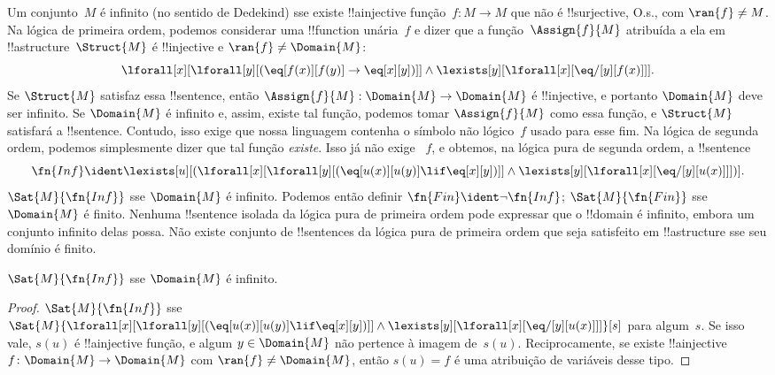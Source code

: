 \documentclass[../../../include/open-logic-section]{subfiles}
\begin{document}


Um conjunto~$M$ é infinito (no sentido de Dedekind) sse existe
!!a{injective} função~$f\colon M \to M$ que não é !!{surjective}, O.s.\@,
com $\ran{f} \neq M$. Na lógica de primeira ordem, podemos considerar uma
!!{function} unária~$f$ e dizer que a função~$\Assign{f}{M}$ atribuída a ela
em !!a{structure}~$\Struct{M}$ é !!{injective} e
$\ran{f} \neq \Domain{M}$:
\[
\lforall[x][\lforall[y][(\eq[f(x)][f(y)] \to \eq[x][y])]] \land
\lexists[y][\lforall[x][\eq/[y][f(x)]]].
\]
Se $\Struct{M}$ satisfaz essa !!{sentence}, então
$\Assign{f}{M}: \Domain{M} \to \Domain{M}$ é !!{injective}, e portanto
$\Domain{M}$ deve ser infinito. Se $\Domain{M}$ é infinito e, assim, existe
tal função, podemos tomar $\Assign{f}{M}$ como essa função, e $\Struct{M}$
satisfará a !!{sentence}. Contudo, isso exige que nossa linguagem contenha o
símbolo não lógico~$f$ usado para esse fim. Na lógica de segunda ordem,
podemos simplesmente dizer que tal função \emph{existe}. Isso já não exige
~$f$, e obtemos, na lógica pura de segunda ordem, a !!{sentence}
\[
\fn{Inf} \ident \lexists[u][(\lforall[x][\lforall[y][(\eq[u(x)][u(y)]
      \lif \eq[x][y])]] \land \lexists[y][\lforall[x][\eq/[y][u(x)]]])].
\]
$\Sat{M}{\fn{Inf}}$ sse $\Domain{M}$ é infinito. Podemos então definir
$\fn{Fin} \ident \lnot \fn{Inf}$; $\Sat{M}{\fn{Fin}}$ sse $\Domain{M}$ é
finito. Nenhuma !!{sentence} isolada da lógica pura de primeira ordem pode
expressar que o !!{domain} é infinito, embora um conjunto infinito delas
possa. Não existe conjunto de !!{sentence}s da lógica pura de primeira
ordem que seja satisfeito em !!a{structure} sse seu domínio é finito.

\begin{prop}
$\Sat{M}{\fn{Inf}}$ sse $\Domain{M}$ é infinito.
\end{prop}

\begin{proof}
$\Sat{M}{\fn{Inf}}$ sse
  $\Sat{M}{\lforall[x][\lforall[y][(\eq[u(x)][u(y)] \lif \eq[x][y])]]
    \land \lexists[y][\lforall[x][\eq/[y][u(x)]]]}[s]$ para algum~$s$.
  Se isso vale, $s(u)$ é !!a{injective} função, e algum
  $y \in \Domain{M}$ não pertence à imagem de~$s(u)$. Reciprocamente, se
  existe !!a{injective} $f\colon \Domain{M} \to \Domain{M}$ com
  $\ran{f} \neq \Domain{M}$, então $s(u) = f$ é uma atribuição de variáveis
  desse tipo.
\end{proof}
\end{document}
